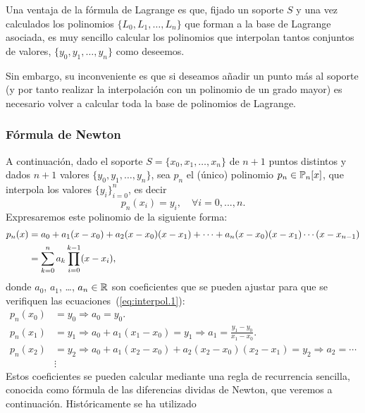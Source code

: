  \begin{remark}
   Una ventaja de la fórmula de Lagrange es que, fijado un soporte $S$
   y una vez calculados los polinomios $\{L_0,L_1,\dots, L_n\}$ que
   forman a la base de Lagrange asociada, es muy sencillo calcular los
   polinomios que interpolan tantos conjuntos de valores,
   $\{y_0,y_1,\dots,y_n\}$ como deseemos. 

   Sin embargo, su inconveniente es que si deseamos añadir un punto más
   al soporte (y por tanto realizar la interpolación con un polinomio
   de un grado mayor) es necesario volver a calcular toda la base de
   polinomios de Lagrange.
 \end{remark}

 \subsubsection{Fórmula de Newton}
 \label{sec:formula-de-newton}
 A continuación, dado el soporte $S=\{x_0,x_1,\dots,x_n\}$ de $n+1$ puntos
 distintos y dados $n+1$ valores $\{y_0,y_1,\dots,y_n\}$, sea
 $p_n$ el (único) polinomio $p_n \in \operatorname{{\mathbb P}}_n[x]$, que
 interpola los valores $\{y_i\}_{i=0}^n$, es decir
 \begin{equation}
   p_n(x_i)=y_i, \quad \forall i=0,...,n.
   \label{eq:interpol.1}
 \end{equation}
 Expresaremos este polinomio de la siguiente forma:
 \begin{align}
   \notag
   p_n(x)&=a_0 + a_1 (x-x_0) + a_2(x-x_0)(x-x_1) + \cdots 
   + a_n(x-x_0)(x-x_1)\cdots(x-x_{n-1}) \\
   &=\sum_{k=0}^n a_k \prod_{i=0}^{k-1}(x-x_i),
   \label{eq:pol.newton.dif-div}
 \end{align}
 donde $a_0$, $a_1$, \dots, $a_n\in\operatorname{{\mathbb R}}$ son coeficientes que se
 pueden ajustar para que se verifiquen las
 ecuaciones~(\ref{eq:interpol.1}):
 \begin{align*}
   p_n(x_0)&=y_0 \Rightarrow a_0=y_0.\\
   p_n(x_1)&=y_1 \Rightarrow a_0+a_1(x_1-x_0)=y_1 
   \Rightarrow a_1=\frac{y_1-y_0}{x_1-x_0}.\\
   p_n(x_2)&=y_2 \Rightarrow a_0+a_1(x_2-x_0)+a_2(x_2-x_0)(x_2-x_1)=y_2 
   \Rightarrow a_2=\cdots\\
   &\vdots
 \end{align*}
 Estos coeficientes se pueden calcular mediante una regla de
 recurrencia sencilla, conocida como fórmula de las diferencias dividas
 de Newton, que veremos a continuación. Históricamente se ha utilizado
